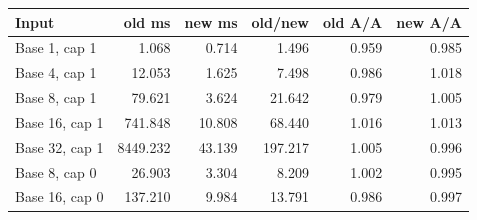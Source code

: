 \begin{center}
\small
\begin{tabular}{lrrrrr}
\toprule
Input & old ms & new ms & old/new & old A/A & new A/A\\
\midrule
Base 1, cap 1 & 1.068 & 0.714 & 1.496 & 0.959 & 0.985\\
Base 4, cap 1 & 12.053 & 1.625 & 7.498 & 0.986 & 1.018\\
Base 8, cap 1 & 79.621 & 3.624 & 21.642 & 0.979 & 1.005\\
Base 16, cap 1 & 741.848 & 10.808 & 68.440 & 1.016 & 1.013\\
Base 32, cap 1 & 8449.232 & 43.139 & 197.217 & 1.005 & 0.996\\
Base 8, cap 0 & 26.903 & 3.304 & 8.209 & 1.002 & 0.995\\
Base 16, cap 0 & 137.210 & 9.984 & 13.791 & 0.986 & 0.997\\
\bottomrule
\end{tabular}
\end{center}
